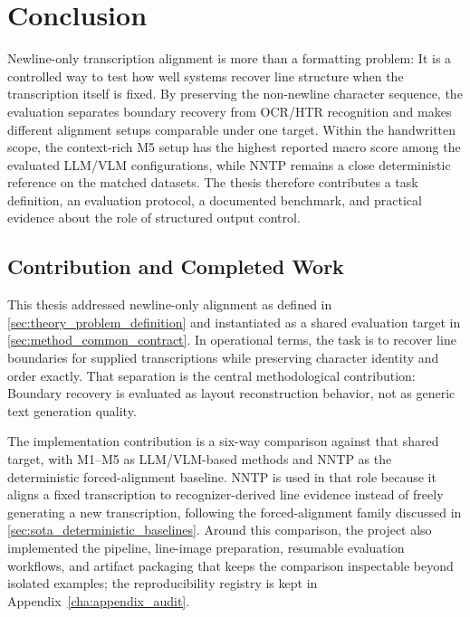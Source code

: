 
\chapter{Conclusion}
\label{cha:conclusion}

Newline-only transcription alignment is more than a formatting problem: It is a controlled way to test how well systems recover line structure when the transcription itself is fixed. By preserving the non-newline character sequence, the evaluation separates boundary recovery from OCR/HTR recognition and makes different alignment setups comparable under one target. Within the handwritten scope, the context-rich M5 setup has the highest reported macro score among the evaluated LLM/VLM configurations, while NNTP remains a close deterministic reference on the matched datasets. The thesis therefore contributes a task definition, an evaluation protocol, a documented benchmark, and practical evidence about the role of structured output control.

\section{Contribution and Completed Work}
\label{sec:conclusion_summary}

This thesis addressed newline-only alignment as defined in \autoref{sec:theory_problem_definition} and instantiated as a shared evaluation target in \autoref{sec:method_common_contract}. In operational terms, the task is to recover line boundaries for supplied transcriptions while preserving character identity and order exactly. That separation is the central methodological contribution: Boundary recovery is evaluated as layout reconstruction behavior, not as generic text generation quality.

The implementation contribution is a six-way comparison against that shared target, with M1--M5 as LLM/VLM-based methods and NNTP as the deterministic forced-alignment baseline. NNTP is used in that role because it aligns a fixed transcription to recognizer-derived line evidence instead of freely generating a new transcription, following the forced-alignment family discussed in \autoref{sec:sota_deterministic_baselines}. Around this comparison, the project also implemented the \OCRHTR pipeline, line-image preparation, resumable evaluation workflows, and artifact packaging that keeps the comparison inspectable beyond isolated examples; the reproducibility registry is kept in Appendix~\ref{cha:appendix_audit}.

